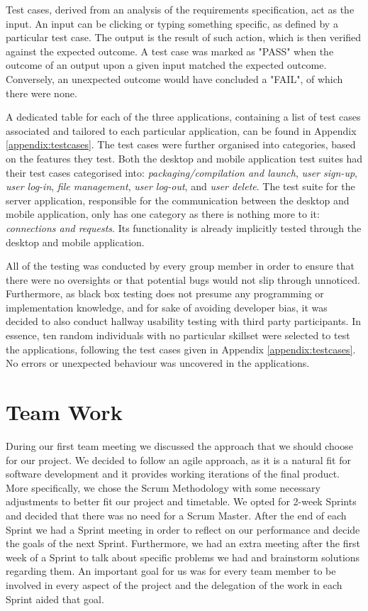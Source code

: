 \documentclass[11pt]{article}
\begin{document}
Test cases, derived from an analysis of the requirements specification, act as the input. An input can be clicking or typing something specific, as defined by a particular test case. The output is the result of such action, which is then verified against the expected outcome. A test case was marked as "PASS" when the outcome of an output upon a given input matched the expected outcome. Conversely, an unexpected outcome would have concluded a "FAIL", of which there were none.

A dedicated table for each of the three applications, containing a list of test cases associated and tailored to each particular application, can be found in Appendix \ref{appendix:testcases}. The test cases were further organised into categories, based on the features they test. Both the desktop and mobile application test suites had their test cases categorised into: \emph{packaging/compilation and launch}, \emph{user sign-up}, \emph{user log-in}, \emph{file management}, \emph{user log-out}, and \emph{user delete}. The test suite for the server application, responsible for the communication between the desktop and mobile application, only has one category as there is nothing more to it: \emph{connections and requests}. Its functionality is already implicitly tested through the desktop and mobile application.

All of the testing was conducted by every group member in order to ensure that there were no oversights or that potential bugs would not slip through unnoticed. Furthermore, as black box testing does not presume any programming or implementation knowledge, and for sake of avoiding developer bias, it was decided to also conduct hallway usability testing \cite{hallwayusabilitytesting:19} with third party participants. In essence, ten random individuals with no particular skillset were selected to test the applications, following the test cases given in Appendix \ref{appendix:testcases}. No errors or unexpected behaviour was uncovered in the applications.


\section{Team Work}

During our first team meeting we discussed the approach that we should choose for our project. We decided to follow an agile approach, as it is a natural fit for software development and it provides working iterations of the final product. More specifically, we chose the Scrum Methodology \cite{rising:00} with some necessary adjustments to better fit our project and timetable. We opted for 2-week Sprints and decided that there was no need for a Scrum Master. After the end of each Sprint we had a Sprint meeting in order to reflect on our performance and decide the goals of the next Sprint. Furthermore, we had an extra meeting after the first week of a Sprint to talk about specific problems we had and brainstorm solutions regarding them. An important goal for us was for every team member to be involved in every aspect of the project and the delegation of the work in each Sprint aided that goal.
\end{document}
